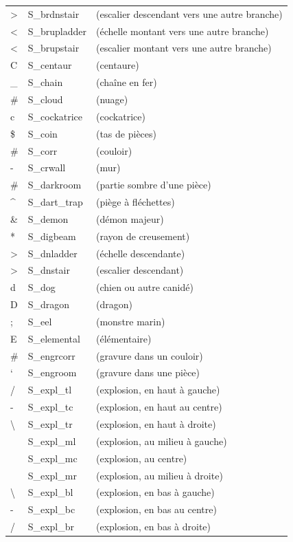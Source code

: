 \documentclass[titlepage]{article}
\begin{document}
\begin{longtable}{lll}
\textgreater{} & S\_brdnstair & (escalier descendant vers une autre branche)\\
\textless{} & S\_brupladder & (échelle montant vers une autre branche)\\
\textless{} & S\_brupstair & (escalier montant vers une autre branche)\\
C & S\_centaur & (centaure)\\
\_ & S\_chain & (chaîne en fer)\\
\# & S\_cloud & (nuage)\\
c & S\_cockatrice & (cockatrice)\\
\$ & S\_coin & (tas de pièces)\\
\# & S\_corr & (couloir)\\
- & S\_crwall & (mur)\\
\# & S\_darkroom & (partie sombre d'une pièce)\\
\textasciicircum{} & S\_dart\_trap & (piège à fléchettes)\\
\& & S\_demon & (démon majeur)\\
* & S\_digbeam & (rayon de creusement)\\
\textgreater{} & S\_dnladder & (échelle descendante)\\
\textgreater{} & S\_dnstair & (escalier descendant)\\
d & S\_dog & (chien ou autre canidé)\\
D & S\_dragon & (dragon)\\
; & S\_eel & (monstre marin)\\
E & S\_elemental & (élémentaire)\\
\# & S\_engrcorr & (gravure dans un couloir)\\
` & S\_engroom & (gravure dans une pièce)\\
/ & S\_expl\_tl & (explosion, en haut à gauche)\\
- & S\_expl\_tc & (explosion, en haut au centre)\\
\textbackslash{} & S\_expl\_tr & (explosion, en haut à droite)\\
\textbar{} & S\_expl\_ml & (explosion, au milieu à gauche)\\
~ & S\_expl\_mc & (explosion, au centre)\\
\textbar{} & S\_expl\_mr & (explosion, au milieu à droite)\\
\textbackslash{} & S\_expl\_bl & (explosion, en bas à gauche)\\
- & S\_expl\_bc & (explosion, en bas au centre)\\
/ & S\_expl\_br & (explosion, en bas à droite)\\

\end{longtable}
\end{document}

